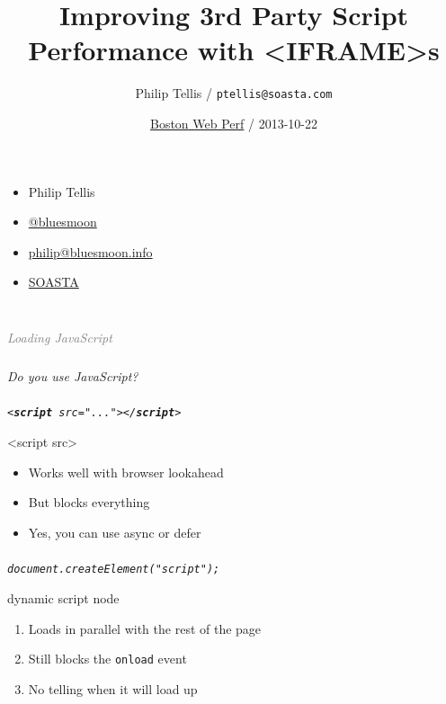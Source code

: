 \documentclass{beamer}
\author{Philip Tellis / \texttt{ptellis@soasta.com}}
\title{Improving 3rd Party Script Performance with <IFRAME>s}
\date{\href{http://www.meetup.com/Web-Performance-Boston/events/143640602/}{Boston Web Perf} / 2013-10-22}
\newcommand{\innersplash}[1]{
  \begin{center}
    \Large \textrm{\textit{ #1 } }
  \end{center}
}
\newcommand{\splashslide}[2][{}]{
  \begin{frame}
  \frametitle{#1}
  \innersplash{#2}
  \end{frame}
}
\newcommand{\leadinslide}[2]{
  \splashslide{
     {\fontsize{150}{20}\selectfont{\raisebox{0pt}[90pt][0pt]{\textcolor{light-gray}{#1}}}} \\ \huge \textcolor{gray}{#2}
  }
}
\def\green<#1>#2{\textcolor<#1>{dark-green}{\textbf<#1>{#2}}}
\begin{document}
\begin{frame}
  \titlepage
\end{frame}

\begin{frame}
  \begin{itemize}
  \item Philip Tellis
  \item \href{http://twitter.com/bluesmoon}{@bluesmoon}
  \item \href{http://bluesmoon.info/}{philip@bluesmoon.info}
  \item \href{http://www.soasta.com/}{SOASTA}
  \end{itemize}
\end{frame}

\leadinslide{1}{Loading JavaScript}

\splashslide{Do you use JavaScript?}

\splashslide{\texttt{<\green<1>{script} src="..."></\green<1>{script}>}}

\begin{frame}{<script src>}
\begin{itemize}
  \item Works well with browser lookahead
  \item But blocks everything
  \item Yes, you can use async or defer
\end{itemize}
\end{frame}

\begin{frame}
\end{frame}

\splashslide{\texttt{document.createElement("script");}}

\begin{frame}{dynamic script node}
\begin{enumerate}
  \item Loads in parallel with the rest of the page
  \item Still blocks the \texttt{onload} event
  \item No telling when it will load up
\end{enumerate}
\end{frame}
\end{document}
